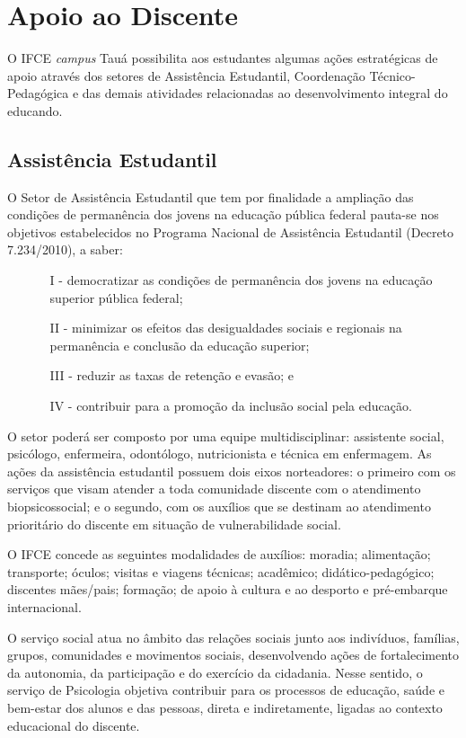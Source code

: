 \documentclass[
	12pt,				%
	openright,			%
	twoside,			%
	a4paper,			%
	chapter=TITLE,		%
	english,			%
	french,				%
	spanish,			%
	brazil,				%
	]{abntex2}
\begin{document}
\chapter{Apoio ao Discente}
O IFCE \textit{campus} Tauá possibilita aos estudantes algumas ações estratégicas de apoio através dos setores de Assistência Estudantil, Coordenação Técnico-Pedagógica e das demais atividades relacionadas ao desenvolvimento integral do educando.


\section{Assistência Estudantil}
O  Setor de Assistência Estudantil que tem por finalidade a ampliação das condições de permanência dos jovens na educação pública federal pauta-se nos objetivos estabelecidos no Programa Nacional de Assistência Estudantil (Decreto 7.234/2010), a saber:
\begin{itemize}
\item[]
\begin{itemize}
    \setlength\itemsep{0em}
    \item[I -] democratizar as condições de permanência dos jovens na educação superior pública federal;
    \item[II -] minimizar os efeitos das desigualdades sociais e regionais na permanência e conclusão da educação superior;
    \item[III -] reduzir as taxas de retenção e evasão; e
    \item[IV -] contribuir para a promoção da inclusão social pela educação.
\end{itemize}
\end{itemize}

O setor poderá ser composto por uma equipe multidisciplinar: assistente social, psicólogo,
enfermeira, odontólogo, nutricionista e técnica em enfermagem. As ações da assistência estudantil possuem dois eixos norteadores: o primeiro com os serviços que visam atender a toda comunidade discente com o atendimento biopsicossocial; e o segundo, com os auxílios que se destinam ao atendimento prioritário do discente em situação de vulnerabilidade social.


O IFCE concede as seguintes modalidades de auxílios: moradia; alimentação; transporte; óculos; visitas e viagens técnicas; acadêmico; didático-pedagógico; discentes mães/pais; formação; de apoio à cultura e ao desporto e pré-embarque internacional.

O serviço social atua no âmbito das relações sociais junto aos indivíduos, famílias, grupos, comunidades e movimentos sociais, desenvolvendo ações de fortalecimento da autonomia, da participação e do exercício da cidadania. Nesse sentido, o serviço de Psicologia objetiva contribuir para os processos de educação, saúde e bem-estar dos alunos e das pessoas, direta e indiretamente, ligadas ao contexto educacional do discente.
\end{document}
